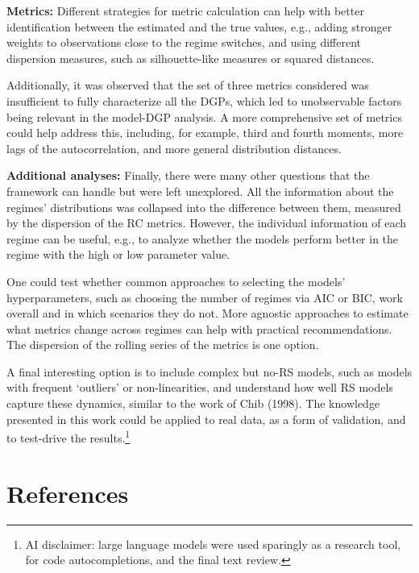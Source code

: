 \documentclass[
  letterpaper,
  DIV=11,
  numbers=noendperiod]{scrartcl}
\numberwithin{equation}{section}
\numberwithin{table}{section}
\numberwithin{figure}{section}
\let\oldsection\section
\renewcommand\section{\clearpage\oldsection}
\begin{document}
\textbf{Metrics:} Different strategies for metric calculation can help
with better identification between the estimated and the true values,
e.g., adding stronger weights to observations close to the regime
switches, and using different dispersion measures, such as
silhouette-like measures or squared distances.

Additionally, it was observed that the set of three metrics considered
was insufficient to fully characterize all the DGPs, which led to
unobservable factors being relevant in the model-DGP analysis. A more
comprehensive set of metrics could help address this, including, for
example, third and fourth moments, more lags of the autocorrelation, and
more general distribution distances.

\textbf{Additional analyses:} Finally, there were many other questions
that the framework can handle but were left unexplored. All the
information about the regimes' distributions was collapsed into the
difference between them, measured by the dispersion of the RC metrics.
However, the individual information of each regime can be useful, e.g.,
to analyze whether the models perform better in the regime with the high
or low parameter value.

One could test whether common approaches to selecting the models'
hyperparameters, such as choosing the number of regimes via AIC or BIC,
work overall and in which scenarios they do not. More agnostic
approaches to estimate what metrics change across regimes can help with
practical recommendations. The dispersion of the rolling series of the
metrics is one option.

A final interesting option is to include complex but no-RS models, such
as models with frequent `outliers' or non-linearities, and understand
how well RS models capture these dynamics, similar to the work of Chib
(1998). The knowledge presented in this work could be applied to real
data, as a form of validation, and to test-drive the results.\footnote{AI
  disclaimer: large language models were used sparingly as a research
  tool, for code autocompletions, and the final text review.}

\section*{References}\label{references}
\end{document}
